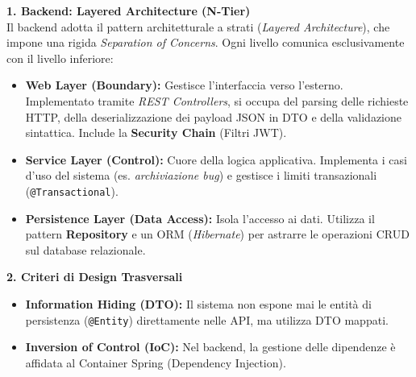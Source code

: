 \documentclass[a4paper,12pt]{article}
\begin{document}
\begin{tcolorbox}[
    enhanced,
    colback=BoxLight,
    colframe=UninaBlue,
    boxrule=0.8pt,
    arc=3pt,
    sharp corners,
    title=Pattern Architetturali e Design di Dettaglio,
    fonttitle=\bfseries,
    coltitle=white,
    breakable
]
\textbf{1. Backend: Layered Architecture (N-Tier)} \\
Il backend adotta il pattern architetturale a strati (\textit{Layered Architecture}), che impone una rigida \textit{Separation of Concerns}. Ogni livello comunica esclusivamente con il livello inferiore:

\begin{itemize}
    \item \textbf{Web Layer (Boundary):} Gestisce l'interfaccia verso l'esterno. Implementato tramite \textit{REST Controllers}, si occupa del parsing delle richieste HTTP, della deserializzazione dei payload JSON in DTO e della validazione sintattica. Include la \textbf{Security Chain} (Filtri JWT).
    
    \item \textbf{Service Layer (Control):} Cuore della logica applicativa. Implementa i casi d'uso del sistema (es. \textit{archiviazione bug}) e gestisce i limiti transazionali (\texttt{@Transactional}).
    
    \item \textbf{Persistence Layer (Data Access):} Isola l'accesso ai dati. Utilizza il pattern \textbf{Repository} e un ORM (\textit{Hibernate}) per astrarre le operazioni CRUD sul database relazionale.
\end{itemize}

\vspace{0.3cm}
\textbf{2. Criteri di Design Trasversali}
\begin{itemize}
    \item \textbf{Information Hiding (DTO):} Il sistema non espone mai le entità di persistenza (\texttt{@Entity}) direttamente nelle API, ma utilizza DTO mappati.
    \item \textbf{Inversion of Control (IoC):} Nel backend, la gestione delle dipendenze è affidata al Container Spring (Dependency Injection).
\end{itemize}


\end{tcolorbox}
\end{document}
